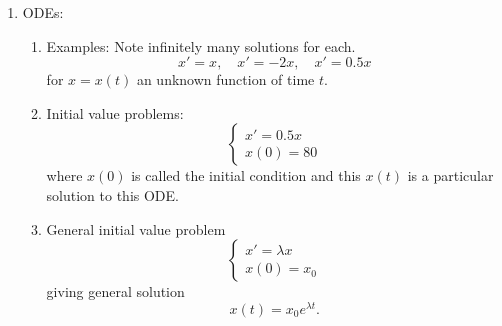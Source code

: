 \documentclass{article}
\begin{document}
\begin{enumerate}

\item ODEs:
\begin{enumerate}
\item Examples: Note infinitely many solutions for each.
\[
x' = x, \quad
x' = -2x, \quad
x' = 0.5x
\]
for $x=x(t)$ an unknown function of time $t$.
\item Initial value problems: 
\[
\begin{cases}
x' = 0.5x \\
x(0) = 80
\end{cases}
\]
where $x(0)$ is called the initial condition and this $x(t)$ is a particular solution to this ODE.
\item General initial value problem
\[
\begin{cases}
x' = \lambda x \\
x(0) = x_0
\end{cases}
\]
giving general solution
\[
x(t) = x_0 e^{\lambda t}.
\]
\end{enumerate}



\end{enumerate}
\end{document}
